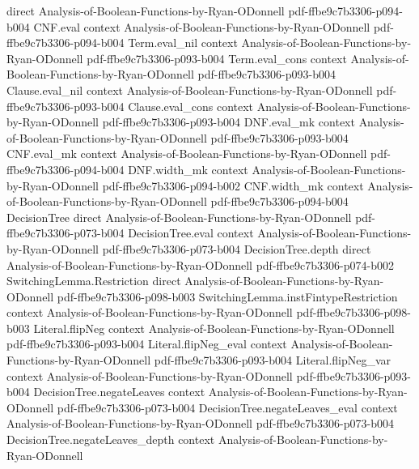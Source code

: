 \begin{theorem}
  {direct}
  {Analysis-of-Boolean-Functions-by-Ryan-ODonnell}
  {pdf-ffbe9c7b3306-p094-b004}
\proofstep
  {CNF.eval}
  {context}
  {Analysis-of-Boolean-Functions-by-Ryan-ODonnell}
  {pdf-ffbe9c7b3306-p094-b004}
\proofstep
  {Term.eval_nil}
  {context}
  {Analysis-of-Boolean-Functions-by-Ryan-ODonnell}
  {pdf-ffbe9c7b3306-p093-b004}
\proofstep
  {Term.eval_cons}
  {context}
  {Analysis-of-Boolean-Functions-by-Ryan-ODonnell}
  {pdf-ffbe9c7b3306-p093-b004}
\proofstep
  {Clause.eval_nil}
  {context}
  {Analysis-of-Boolean-Functions-by-Ryan-ODonnell}
  {pdf-ffbe9c7b3306-p093-b004}
\proofstep
  {Clause.eval_cons}
  {context}
  {Analysis-of-Boolean-Functions-by-Ryan-ODonnell}
  {pdf-ffbe9c7b3306-p093-b004}
\proofstep
  {DNF.eval_mk}
  {context}
  {Analysis-of-Boolean-Functions-by-Ryan-ODonnell}
  {pdf-ffbe9c7b3306-p093-b004}
\proofstep
  {CNF.eval_mk}
  {context}
  {Analysis-of-Boolean-Functions-by-Ryan-ODonnell}
  {pdf-ffbe9c7b3306-p094-b004}
\proofstep
  {DNF.width_mk}
  {context}
  {Analysis-of-Boolean-Functions-by-Ryan-ODonnell}
  {pdf-ffbe9c7b3306-p094-b002}
\proofstep
  {CNF.width_mk}
  {context}
  {Analysis-of-Boolean-Functions-by-Ryan-ODonnell}
  {pdf-ffbe9c7b3306-p094-b004}
\proofstep
  {DecisionTree}
  {direct}
  {Analysis-of-Boolean-Functions-by-Ryan-ODonnell}
  {pdf-ffbe9c7b3306-p073-b004}
\proofstep
  {DecisionTree.eval}
  {context}
  {Analysis-of-Boolean-Functions-by-Ryan-ODonnell}
  {pdf-ffbe9c7b3306-p073-b004}
\proofstep
  {DecisionTree.depth}
  {direct}
  {Analysis-of-Boolean-Functions-by-Ryan-ODonnell}
  {pdf-ffbe9c7b3306-p074-b002}
\proofstep
  {SwitchingLemma.Restriction}
  {direct}
  {Analysis-of-Boolean-Functions-by-Ryan-ODonnell}
  {pdf-ffbe9c7b3306-p098-b003}
\proofstep
  {SwitchingLemma.instFintypeRestriction}
  {context}
  {Analysis-of-Boolean-Functions-by-Ryan-ODonnell}
  {pdf-ffbe9c7b3306-p098-b003}
\proofstep
  {Literal.flipNeg}
  {context}
  {Analysis-of-Boolean-Functions-by-Ryan-ODonnell}
  {pdf-ffbe9c7b3306-p093-b004}
\proofstep
  {Literal.flipNeg_eval}
  {context}
  {Analysis-of-Boolean-Functions-by-Ryan-ODonnell}
  {pdf-ffbe9c7b3306-p093-b004}
\proofstep
  {Literal.flipNeg_var}
  {context}
  {Analysis-of-Boolean-Functions-by-Ryan-ODonnell}
  {pdf-ffbe9c7b3306-p093-b004}
\proofstep
  {DecisionTree.negateLeaves}
  {context}
  {Analysis-of-Boolean-Functions-by-Ryan-ODonnell}
  {pdf-ffbe9c7b3306-p073-b004}
\proofstep
  {DecisionTree.negateLeaves_eval}
  {context}
  {Analysis-of-Boolean-Functions-by-Ryan-ODonnell}
  {pdf-ffbe9c7b3306-p073-b004}
\proofstep
  {DecisionTree.negateLeaves_depth}
  {context}
  {Analysis-of-Boolean-Functions-by-Ryan-ODonnell}

\end{theorem}
